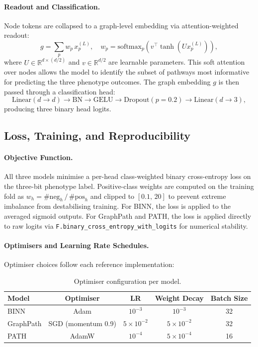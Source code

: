 \paragraph{Readout and Classification.}
Node tokens are collapsed to a graph-level embedding via attention-weighted readout:
\begin{equation}
g = \sum_{p} w_p\, x_p^{(L)}, \quad w_p = \text{softmax}_p\!\left(v^\top \tanh\!\left(U x_p^{(L)}\right)\right),
\end{equation}
where $U \in \mathbb{R}^{d \times (d/2)}$ and $v \in \mathbb{R}^{d/2}$ are learnable parameters. This soft attention over nodes allows the model to identify the subset of pathways most informative for predicting the three phenotype outcomes. The graph embedding $g$ is then passed through a classification head:
\begin{equation}
\text{Linear}(d \to d) \to \text{BN} \to \text{GELU} \to \text{Dropout}(p=0.2) \to \text{Linear}(d \to 3),
\end{equation}
producing three binary head logits.

\subsection{Loss, Training, and Reproducibility}

\paragraph{Objective Function.}
All three models minimise a per-head class-weighted binary cross-entropy loss on the three-bit phenotype label. Positive-class weights are computed on the training fold as $w_h = \#\text{neg}_h\,/\,\#\text{pos}_h$ and clipped to $[0.1,\,20]$ to prevent extreme imbalance from destabilising training. For BINN, the loss is applied to the averaged sigmoid outputs. For GraphPath and PATH, the loss is applied directly to raw logits via \texttt{F.binary\_cross\_entropy\_with\_logits} for numerical stability.

\paragraph{Optimisers and Learning Rate Schedules.}
Optimiser choices follow each reference implementation:

\begin{table}[!h]
\centering
\small
\caption{Optimiser configuration per model.}
\label{tab:optimisers}
\begin{tabular}{lcccc}
\toprule
Model & Optimiser & LR & Weight Decay & Batch Size \\
\midrule
BINN & Adam & $10^{-3}$ & $10^{-3}$ & 32 \\
GraphPath & SGD (momentum 0.9) & $5 \times 10^{-2}$ & $5 \times 10^{-2}$ & 32 \\
PATH & AdamW & $10^{-4}$ & $5 \times 10^{-4}$ & 16 \\
\bottomrule
\end{tabular}
\end{table}

